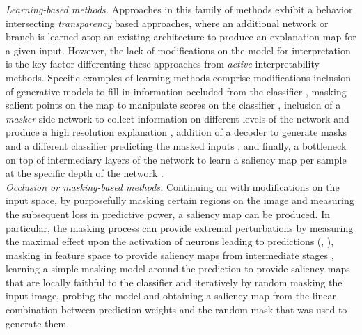 \noindent \emph{Learning-based methods.} Approaches in this family of methods exhibit a behavior 
intersecting  \emph{transparency} based approaches, where an additional network or branch is 
learned atop an existing architecture to produce an explanation map for a given input. However, 
the lack of modifications on the model for interpretation is the key factor differenting these 
approaches from \emph{active} interpretability methods. Specific examples of learning methods 
comprise modifications inclusion of generative models to fill in information occluded from  the 
classifier \autocite{chang2018explaining}, masking salient points on the map to manipulate scores 
on the classifier \autocite{dabkowski2017real}, inclusion of a \emph{masker} side network to 
collect information on different levels of the network and produce a high resolution explanation 
\autocite{phang2020investigating}, addition of a decoder to generate masks and a different 
classifier predicting the masked inputs \autocite{zolna2020classifier}, and finally, a bottleneck 
on top of intermediary layers of the network to learn a saliency map per sample at the specific 
depth of the network \autocite{schulz2020restricting}.\\

\noindent \emph{Occlusion or masking-based methods.} Continuing on with modifications on the input 
space, by purposefully masking certain regions on the image and measuring the subsequent loss in 
predictive power, a saliency map can be produced. In particular, the masking process can provide 
extremal perturbations by measuring the maximal effect upon the activation of neurons leading to 
predictions (\cite{fong2017interpretable}, \cite{fong2019understanding}), masking in feature space 
to provide saliency maps from intermediate stages \autocite{schulz2020restricting}, learning a 
simple masking model around the prediction to provide saliency maps that are locally faithful to the 
classifier \autocite{ribeiro2016should} and iteratively by random masking the input image, probing 
the model and obtaining a saliency map from the linear combination between prediction weights and 
the random mask that was used to generate them. \\

